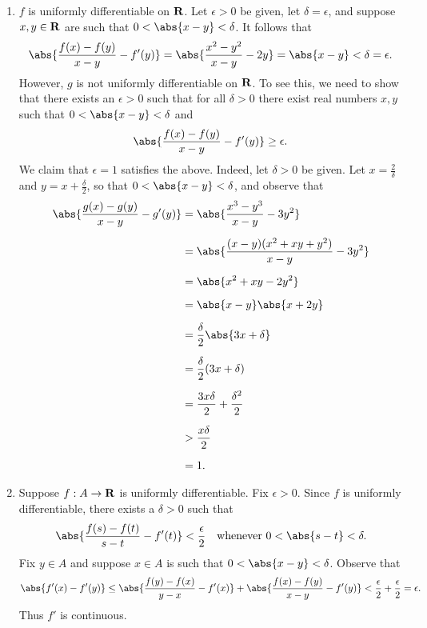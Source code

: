 \documentclass{lew98_solutions}
\begin{document}
\begin{solution}
    \begin{enumerate}
        \item \( f \) is uniformly differentiable on \( \mathbf{R} \). Let \( \epsilon > 0 \) be given, let \( \delta = \epsilon \), and suppose \( x, y \in \mathbf{R} \) are such that \( 0 < \abs{x - y} < \delta \). It follows that
        \[
            \abs{\frac{f(x) - f(y)}{x - y} - f'(y)} = \abs{\frac{x^2 - y^2}{x - y} - 2y} = \abs{x - y} < \delta = \epsilon.
        \]
        However, \( g \) is not uniformly differentiable on \( \mathbf{R} \). To see this, we need to show that there exists an \( \epsilon > 0 \) such that for all \( \delta > 0 \) there exist real numbers \( x, y \) such that \( 0 < \abs{x - y} < \delta \) and
        \[
            \abs{\frac{f(x) - f(y)}{x - y} - f'(y)} \geq \epsilon.
        \]
        We claim that \( \epsilon = 1 \) satisfies the above. Indeed, let \( \delta > 0 \) be given. Let \( x = \tfrac{2}{\delta} \) and \( y = x + \tfrac{\delta}{2} \), so that \( 0 < \abs{x - y} < \delta \), and observe that
        \begin{align*}
            \abs{\frac{g(x) - g(y)}{x - y} - g'(y)} &= \abs{\frac{x^3 - y^3}{x - y} - 3y^2} \\[2mm]
            &= \abs{\frac{(x - y)(x^2 + xy + y^2)}{x - y} - 3y^2} \\[2mm]
            &= \abs{x^2 + xy - 2y^2} \\[2mm]
            &= \abs{x - y} \abs{x + 2y} \\[2mm]
            &= \frac{\delta}{2} \abs{3x + \delta} \\[2mm]
            &= \frac{\delta}{2} (3x + \delta) \\[2mm]
            &= \frac{3x \delta}{2} + \frac{\delta^2}{2} \\[2mm]
            &> \frac{x \delta}{2} \\[2mm]
            &= 1.
        \end{align*}

        \item Suppose \( f : A \to \mathbf{R} \) is uniformly differentiable. Fix \( \epsilon > 0 \). Since \( f \) is uniformly differentiable, there exists a \( \delta > 0 \) such that
        \[
            \abs{\frac{f(s) - f(t)}{s - t} - f'(t)} < \frac{\epsilon}{2} \quad \text{whenever } 0 < \abs{s - t} < \delta.
        \]
        Fix \( y \in A \) and suppose \( x \in A \) is such that \( 0 < \abs{x - y} < \delta \). Observe that
        \[
            \abs{f'(x) - f'(y)} \leq \abs{\frac{f(y) - f(x)}{y - x} - f'(x)} + \abs{\frac{f(x) - f(y)}{x - y} - f'(y)} < \frac{\epsilon}{2} + \frac{\epsilon}{2} = \epsilon.
        \]
        Thus \( f' \) is continuous.


\end{enumerate}
\end{solution}
\end{document}
